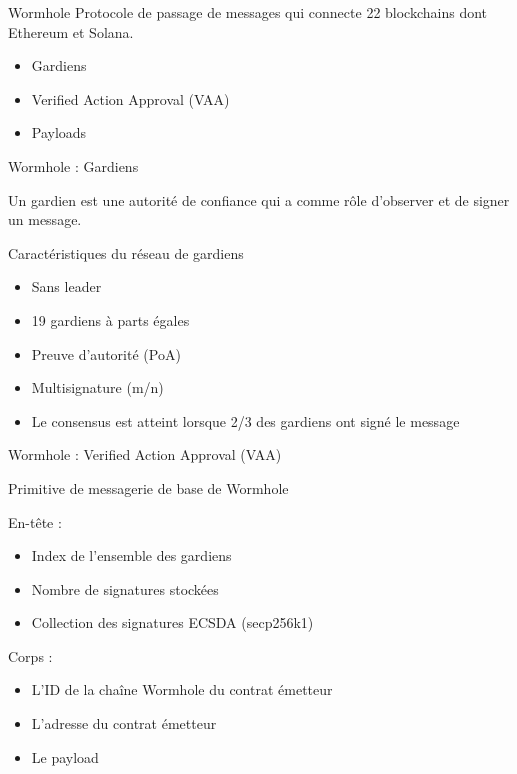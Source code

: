 \begin{frame}{Wormhole}
Protocole de passage de messages qui connecte 22 blockchains dont Ethereum et Solana.
\newline

\begin{itemize}
    \item Gardiens
    \item Verified Action Approval (VAA)
    \item Payloads
\end{itemize}
\end{frame}

\begin{frame}{Wormhole : Gardiens}

Un gardien est une autorité de confiance qui a comme rôle d'observer et de signer un message.\newline

    \begin{block}{Caractéristiques du réseau de gardiens}
        \begin{itemize}
            \item Sans leader
            \item 19 gardiens à parts égales
            \item Preuve d'autorité (PoA)
            \item Multisignature (m/n)
            \item Le consensus est atteint lorsque 2/3 des gardiens ont signé le message
        \end{itemize}
    \end{block}
\end{frame}

\begin{frame}{Wormhole : Verified Action Approval (VAA)}

Primitive de messagerie de base de Wormhole
\newline

En-tête :
\begin{itemize}
    \item Index de l'ensemble des gardiens
    \item Nombre de signatures stockées
    \item Collection des signatures ECSDA (secp256k1)
\end{itemize}

Corps : 
\begin{itemize}
    \item L'ID de la chaîne Wormhole du contrat émetteur
    \item L'adresse du contrat émetteur
    \item Le payload
\end{itemize}
\end{frame}


